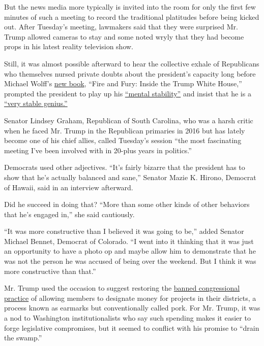 But the news media more typically is invited into the room for only the
first few minutes of such a meeting to record the traditional platitudes
before being kicked out. After Tuesday's meeting, lawmakers said that
they were surprised Mr. Trump allowed cameras to stay and some noted
wryly that they had become props in his latest reality television show.

Still, it was almost possible afterward to hear the collective exhale of
Republicans who themselves nursed private doubts about the president's
capacity long before Michael Wolff's
\href{https://www.nytimes3xbfgragh.onion/2018/01/04/business/media/michael-wolff-trump.html}{new
book}, ``Fire and Fury: Inside the Trump White House,'' prompted the
president to play up his
\href{https://twitter.com/realDonaldTrump/status/949618475877765120}{``mental
stability''} and insist that he is a
\href{https://twitter.com/realDonaldTrump/status/949619270631256064}{``very
stable genius.''}

Senator Lindsey Graham, Republican of South Carolina, who was a harsh
critic when he faced Mr. Trump in the Republican primaries in 2016 but
has lately become one of his chief allies, called Tuesday's session
``the most fascinating meeting I've been involved with in 20-plus years
in politics.''

Democrats used other adjectives. ``It's fairly bizarre that the
president has to show that he's actually balanced and sane,'' Senator
Mazie K. Hirono, Democrat of Hawaii, said in an interview afterward.

Did he succeed in doing that? ``More than some other kinds of other
behaviors that he's engaged in,'' she said cautiously.

``It was more constructive than I believed it was going to be,'' added
Senator Michael Bennet, Democrat of Colorado. ``I went into it thinking
that it was just an opportunity to have a photo op and maybe allow him
to demonstrate that he was not the person he was accused of being over
the weekend. But I think it was more constructive than that.''

Mr. Trump used the occasion to suggest restoring the
\href{http://www.nytimes3xbfgragh.onion/2010/11/17/us/politics/17memo.html}{banned
congressional practice} of allowing members to designate money for
projects in their districts, a process known as earmarks but
conventionally called pork. For Mr. Trump, it was a nod to Washington
institutionalists who say such spending makes it easier to forge
legislative compromises, but it seemed to conflict with his promise to
``drain the swamp.''

